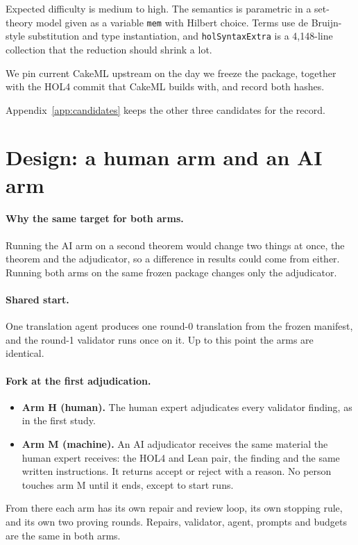\documentclass[11pt,a4paper]{article}
\newcommand{\code}[1]{\texttt{#1}}
\begin{document}
Expected difficulty is medium to high. The semantics is parametric in a set-theory model given as a variable \code{mem} with Hilbert choice. Terms use de Bruijn-style substitution and type instantiation, and \code{holSyntaxExtra} is a 4{,}148-line collection that the reduction should shrink a lot.

We pin current CakeML upstream on the day we freeze the package, together with the HOL4 commit that CakeML builds with, and record both hashes.

Appendix~\ref{app:candidates} keeps the other three candidates for the record.

\section{Design: a human arm and an AI arm}
\paragraph{Why the same target for both arms.} Running the AI arm on a second theorem would change two things at once, the theorem and the adjudicator, so a difference in results could come from either. Running both arms on the same frozen package changes only the adjudicator.

\paragraph{Shared start.} One translation agent produces one round-0 translation from the frozen manifest, and the round-1 validator runs once on it. Up to this point the arms are identical.

\paragraph{Fork at the first adjudication.}
\begin{itemize}
\item \textbf{Arm H (human).} The human expert adjudicates every validator finding, as in the first study.
\item \textbf{Arm M (machine).} An AI adjudicator receives the same material the human expert receives: the HOL4 and Lean pair, the finding and the same written instructions. It returns accept or reject with a reason. No person touches arm M until it ends, except to start runs.
\end{itemize}
From there each arm has its own repair and review loop, its own stopping rule, and its own two proving rounds. Repairs, validator, agent, prompts and budgets are the same in both arms.
\end{document}
